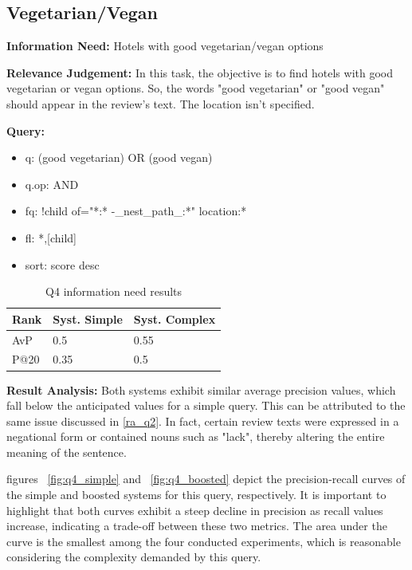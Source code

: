 \documentclass[sigconf]{acmart}
\begin{document}
\subsection{Vegetarian/Vegan}\label{subsec:q4}

\textbf{Information Need:} Hotels with good vegetarian/vegan options

\textbf{Relevance Judgement:} In this task, the objective is to find hotels with good vegetarian or vegan options. So, the words "good vegetarian" or "good vegan" should appear in the review's text. The location isn't specified.

\textbf{Query:}

\begin{itemize}
    \item q: (good vegetarian) OR (good vegan)
    \item q.op: AND
    \item fq: {!child of="*:* -\_nest\_path\_:*"} location:*
    \item fl: *,[child]
    \item sort: score desc
\end{itemize}

\begin{table}[h]
\caption{Q4 information need results}
\label{tab:q4}
\begin{tabular}{lll}
\toprule
Rank & Syst. Simple & Syst. Complex\\
\midrule
AvP & 0.5 & 0.55  \\
P@20 & 0.35 & 0.5 \\
\bottomrule
\end{tabular}
\end{table}


\textbf{Result Analysis:} Both systems exhibit similar average precision values, which fall below the anticipated values for a simple query. This can be attributed to the same issue discussed in \ref{ra_q2}. In fact, certain review texts were expressed in a negational form or contained nouns such as "lack", thereby altering the entire meaning of the sentence.

figures ~\ref{fig:q4_simple} and ~\ref{fig:q4_boosted} depict the precision-recall curves of the simple and boosted systems for this query, respectively. It is important to highlight that both curves exhibit a steep decline in precision as recall values increase, indicating a trade-off between these two metrics. The area under the curve is the smallest among the four conducted experiments, which is reasonable considering the complexity demanded by this query.
\end{document}
